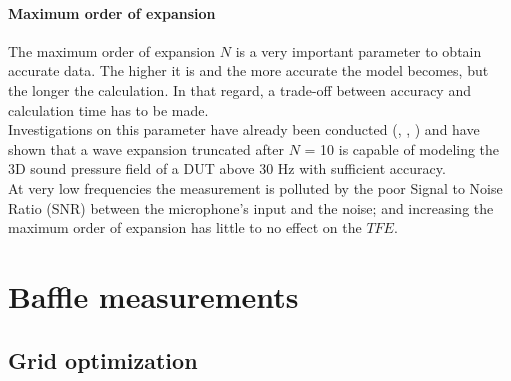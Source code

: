 \documentclass{report}
\begin{document}
\subsubsection{Maximum order of expansion}

The maximum order of expansion $N$ is a very important parameter to obtain accurate data. The higher it is and the more accurate the model becomes, but the longer the calculation. In that regard, a trade-off between accuracy and calculation time has to be made. \\

Investigations on this parameter have already been conducted (\cite{train8}, \cite{aeshs}, \cite{pres}) and have shown that a wave expansion truncated after $N$ = 10 is capable of modeling the 3D sound pressure field of a DUT above 30 Hz with sufficient accuracy. \\

At very low frequencies the measurement is polluted by the poor Signal to Noise Ratio (SNR) between the microphone's input and the noise; and increasing the maximum order of expansion has little to no effect on the $TFE$. 



\chapter{Baffle measurements}

\section{Grid optimization}
\end{document}
